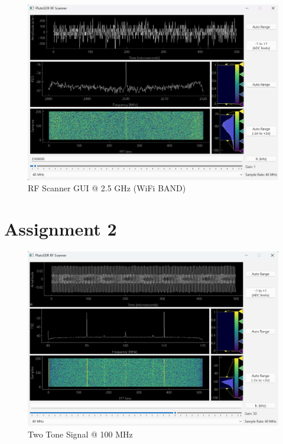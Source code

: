 \documentclass[
	letterpaper, %
	10pt, %
]{CSUniSchoolLabReport}
\begin{document}
\begin{figure}[H] %
	\centering %
	\includegraphics[width=1.2\textwidth]{assignment1b.png} %
	\caption{RF Scanner GUI @ 2.5 GHz (WiFi BAND)}
	\label{fig:block}
\end{figure}

\section{Assignment 2}

\begin{figure}[H] %
	\centering %
	\includegraphics[width=1.2\textwidth]{assignment2a.png} %
	\caption{Two Tone Signal @ 100 MHz}
	\label{fig:block}
\end{figure}
\end{document}
